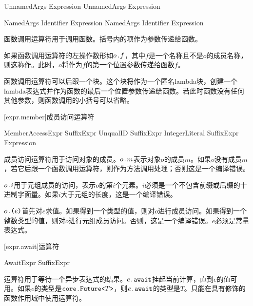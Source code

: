 \begin{bnf}{UnnamedArgs}
    Expression \br
    UnnamedArgs \terminal{,} Expression
\end{bnf}

\begin{bnf}{NamedArgs}
    Identifier \terminal{:} Expression \br
    NamedArgs \terminal{,} Identifier \terminal{:} Expression
\end{bnf}

\pnum
函数调用运算符用于调用函数。括号内的项作为参数传递给函数。

\pnum
如果函数调用运算符的左操作数形如$o\texttt{.}f$，其中$f$是一个名称且不是$o$的成员名称，则这称作。此时，$o$将作为$f$的第一个位置参数传递给函数$f$。

\pnum
函数调用运算符可以后跟一个块。这个块将作为一个匿名lambda块，创建一个lambda表达式并作为函数的最后一个位置参数传递给函数。若此时函数没有任何其他参数，则函数调用的小括号可以省略。

[expr.member]{成员访问运算符}

\begin{bnf}{MemberAccessExpr}
    SuffixExpr  UnqualID \br
    SuffixExpr  IntegerLiteral \br
    SuffixExpr  \terminal{(} Expression \terminal{)}
\end{bnf}

\pnum
成员访问运算符用于访问对象的成员。$o\texttt{.}m$表示对象$o$的成员$m$。如果$o$没有成员$m$，若它后跟一个函数调用运算符，则作为方法调用处理；否则这是一个编译错误。

\pnum
$o\texttt{.}i$用于元组成员的访问，表示$o$的第$i$个元素。$i$必须是一个不包含前缀或后缀的十进制字面量。如果$i$大于元组的长度，这是一个编译错误。

\pnum
$o\texttt{.(}e\texttt{)}$首先对$e$求值。如果得到一个类型的值，则对$o$进行成员访问。如果得到一个整数类型的值，则对$o$进行元组成员访问。否则，这是一个编译错误。$e$必须是常量表达式。

[expr.await]{运算符}

\begin{bnf}{AwaitExpr}
    SuffixExpr  
\end{bnf}

\pnum
{}运算符用于等待一个异步表达式的结果。$e\texttt{.await}$挂起当前计算，直到$e$的值可用。如果$e$的类型是$\texttt{core.Future<}T\texttt{>}$，则$e\texttt{.await}$的类型是$T$。只能在具有修饰的函数作用域中使用运算符。

